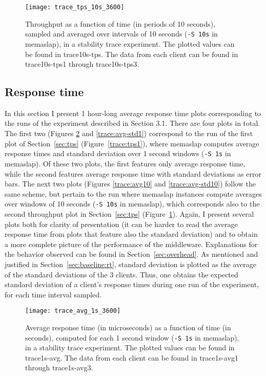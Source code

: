 \documentclass[11pt]{article}
\begin{document}
\begin{figure}[H]
	\centering
	\texttt{[image: trace\_tps\_10s\_3600]}
	\caption{Throughput as a function of time (in periods of 10 seconds), sampled and averaged over intervals of 10 seconds (\texttt{-S 10s} in memaslap), in a stability trace experiment. The plotted values can be found in trace10s-tps. The data from each client can be found in trace10s-tps1 through trace10s-tps3.}
	\label{trace:tps10}
\end{figure}

\subsection{Response time}\label{sec:avg}

In this section I present 1 hour-long average response time plots corresponding to the runs of the experiment described in Section 3.1. There are four plots in total. The first two (Figures \ref{trace:avg1} and \ref{trace:avg-std1}) correspond to the run of the first plot of Section~\ref{sec:tps} (Figure~\ref{trace:tps1}), where memaslap computes average response times and standard deviation over 1 second windows (\texttt{-S 1s} in memaslap). Of these two plots, the first features only average response time, while the second features average response time with standard deviations as error bars. The next two plots (Figures \ref{trace:avg10} and \ref{trace:avg-std10}) follow the same scheme, but pertain to the run where memaslap instances compute averages over windows of 10 seconds (\texttt{-S 10s} in memaslap), which corresponds also to the second throughput plot in Section~\ref{sec:tps} (Figure~\ref{trace:tps10}). Again, I present several plots both for clarity of presentation (it can be harder to read the average response time from plots that feature also the standard deviation) and to obtain a more complete picture of the performance of the middleware. Explanations for the behavior observed can be found in Section~\ref{sec:overhead}. As mentioned and justified in Section~\ref{sec:baseline:rt}, standard deviation is plotted as the average of the standard deviations of the 3 clients. Thus, one obtains the expected standard deviation of a client's response times during one run of the experiment, for each time interval sampled.

\begin{figure}[H]
	\centering
	\texttt{[image: trace\_avg\_1s\_3600]}
	\caption{Average response time (in microseconds) as a function of time (in seconds), computed for each 1 second window (\texttt{-S 1s} in memaslap), in a stability trace experiment. The plotted values can be found in trace1s-avg. The data from each client can be found in trace1s-avg1 through trace1s-avg3.}
	\label{trace:avg1}
\end{figure}
\end{document}
